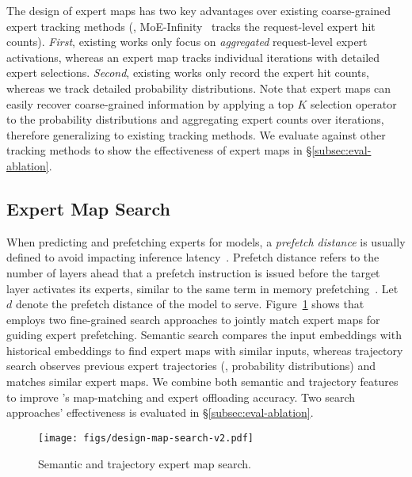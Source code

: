 The design of expert maps has two key advantages over existing coarse-grained expert tracking methods (\eg, MoE-Infinity~\cite{xue2024moe} tracks the request-level expert hit counts).
%
\textit{First}, existing works only focus on \textit{aggregated} request-level expert activations, whereas an expert map tracks individual iterations with detailed expert selections.
%
\textit{Second}, existing works only record the expert hit counts, whereas we track detailed probability distributions. 
% 
Note that expert maps can easily recover coarse-grained information by applying a top $K$ selection operator to the probability distributions and aggregating expert counts over iterations, therefore generalizing to existing tracking methods.
%
We evaluate \sys against other tracking methods to show the effectiveness of expert maps in \S\ref{subsec:eval-ablation}.


\subsection{Expert Map Search}
\label{subsec:design-similarity-match}

When predicting and prefetching experts for \MoE models, a \textit{prefetch distance} is usually defined to avoid impacting inference latency~\cite{song2024promoe}. 
%
Prefetch distance refers to the number of layers ahead that a prefetch instruction is issued before the target layer activates its experts, similar to the same term in memory prefetching~\cite{lee2012prefetching}.
Let $d$ denote the prefetch distance of the \MoE model to serve. 
%
Figure~\ref{fig:design-map-search} shows that \sys employs two fine-grained search approaches to jointly match expert maps for 
guiding expert prefetching. 
%
%
Semantic search compares the input embeddings with historical embeddings to find expert maps with similar inputs, whereas trajectory search observes previous expert trajectories (\ie, probability distributions) and matches similar expert maps.
We combine both semantic and trajectory features to improve \sys's map-matching and expert offloading accuracy.
Two search approaches' effectiveness is evaluated in \S\ref{subsec:eval-ablation}.

\begin{figure}[t]
  \centering
  \texttt{[image: figs/design-map-search-v2.pdf]}
  \vspace{-0.2in}
  \caption{Semantic and trajectory expert map search.}
  \vspace{-0.1in}
  \label{fig:design-map-search}
\end{figure}


